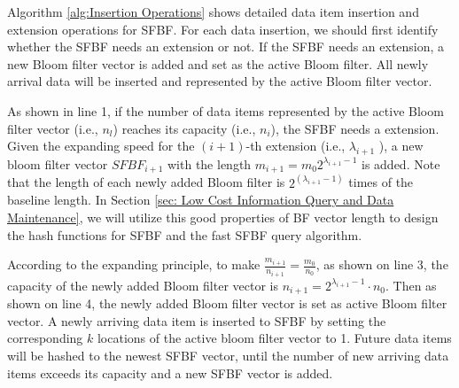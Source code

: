 \documentclass[10pt,journal,compsoc]{IEEEtran}
\begin{document}
Algorithm \ref{alg:Insertion Operations} shows detailed data item insertion and extension  operations for SFBF. For each data insertion, we should first identify whether the SFBF needs an extension or not. If the SFBF needs an extension, a new Bloom filter vector is added and set as the active Bloom filter. All newly arrival data will be inserted and represented by the active Bloom filter vector.

As shown in line 1, if the number of data items represented by the active Bloom filter vector (i.e., $n_l$) reaches its capacity (i.e., ${n_i}$), the SFBF needs a extension. Given the expanding speed for the $(i+1)$-th extension (i.e., ${\lambda _{i+1}}$ ), a new bloom filter vector $SFBF_{i+1}$ with the length ${m_{i+1}} = {m_0}{2^{{\lambda_{i+1}}-1}}$ is added. Note that the length of each newly added Bloom filter is ${2^{\left( {{\lambda _{i+1}} - 1} \right)}}$ times of the baseline length. In Section \ref{sec: Low Cost Information Query and Data Maintenance}, we will utilize this  good properties of BF vector length  to design the hash functions for SFBF and the fast SFBF query algorithm.

According to the expanding principle, to make $\frac{{{m_{i + 1}}}}{{{n_{i + 1}}}} = \frac{{{m_0}}}{{{n_0}}}$,  as shown on line 3, the capacity of the newly added Bloom filter vector is ${n_{i + 1}} = {2^{{\lambda_{i+1} } - 1}} \cdot {n_0}$. Then as shown  on line 4, the newly added Bloom filter vector is set as active Bloom filter vector. A newly arriving data item is inserted to SFBF by setting the corresponding $k$ locations of the active bloom filter vector to 1. Future data items will be hashed to the newest SFBF vector, until  the number of new arriving data items exceeds its capacity and a new SFBF vector is added.
\end{document}
